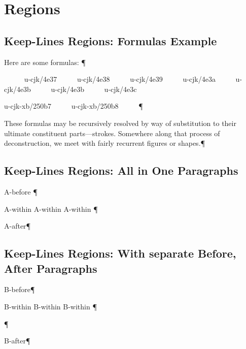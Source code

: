 

\chapter{Regions
}

\section{Keep-Lines Regions: Formulas Example
}
Here are some formulas:
¶\par
\begingroup{}     
{\mktsFontfileSourcecodeproregular{}u-cjk/4e37}     
{\mktsFontfileSourcecodeproregular{}u-cjk/4e38}     
{\mktsFontfileSourcecodeproregular{}u-cjk/4e39}     
{\mktsFontfileSourcecodeproregular{}u-cjk/4e3a}     
{\mktsFontfileSourcecodeproregular{}u-cjk/4e3b}     
{\mktsFontfileSourcecodeproregular{}u-cjk/4e3b}     
{\mktsFontfileSourcecodeproregular{}u-cjk/4e3c}     

{\mktsFontfileSourcecodeproregular{}u-cjk-xb/250b7}     
{\mktsFontfileSourcecodeproregular{}u-cjk-xb/250b8}     
\endgroup{}¶\par
These formulas may be recursively resolved by way of substitution to their
ultimate constituent parts—strokes. Somewhere along that process of
deconstruction, we meet with fairly recurrent figures or shapes.¶\par

\section{Keep-Lines Regions: All in One Paragraphs
}
A-before
¶\par
\begingroup\obeyalllines{}A-within
A-within
A-within
\endgroup{}¶\par
A-after¶\par

\section{Keep-Lines Regions: With separate Before, After Paragraphs
}
B-before¶\par
\begingroup\obeyalllines{}B-within
B-within
B-within
\endgroup{}¶\par
¶\par
B-after¶\par

